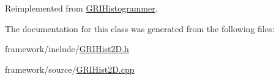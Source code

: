 \-Reimplemented from \hyperlink{classGRIHistogrammer_aba8518e4a4faf8f720ccb72c33a58170}{\-G\-R\-I\-Histogrammer}.



\-The documentation for this class was generated from the following files\-:\begin{DoxyCompactItemize}
\item 
framework/include/\hyperlink{GRIHist2D_8h}{\-G\-R\-I\-Hist2\-D.\-h}\item 
framework/source/\hyperlink{GRIHist2D_8cpp}{\-G\-R\-I\-Hist2\-D.\-cpp}\end{DoxyCompactItemize}
